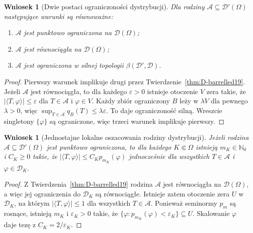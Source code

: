 \documentclass[11pt,a4paper]{article}
\numberwithin{equation}{section}
\theoremstyle{plain}
\newtheorem{wniosek}[twierdzenie]{Wniosek}
\theoremstyle{definition}
\theoremstyle{remark}
\newcommand{\N}{\mathbb N}
\begin{document}
\begin{wniosek}[Dwie postaci ograniczoności dystrybucji]
\label{cor:bounded-distributions19}
Dla rodziny $\mathcal A\subseteq\mathcal D'(\Omega)$
następujące warunki są równoważne:
\begin{enumerate}
\item $\mathcal A$ jest punktowo ograniczona na $\mathcal D(\Omega)$;
\item $\mathcal A$ jest równociągła na $\mathcal D(\Omega)$;
\item $\mathcal A$ jest ograniczona w silnej topologii
$\beta(\mathcal D',\mathcal D)$.
\end{enumerate}
\end{wniosek}
\begin{proof}
Pierwszy warunek implikuje drugi przez
Twierdzenie~\ref{thm:D-barrelled19}. Jeżeli
$\mathcal A$ jest równociągła, to dla każdego
$\varepsilon>0$ istnieje otoczenie $V$ zera takie,
że $|\langle T,\varphi\rangle|\le\varepsilon$ dla
$T\in\mathcal A$ i $\varphi\in V$.
Każdy zbiór ograniczony $B$ leży w $\lambda V$
dla pewnego $\lambda>0$, więc
$\sup_{T\in\mathcal A}q_B(T)\le\lambda\varepsilon$.
To daje ograniczoność silną. Wreszcie singletony
$\{\varphi\}$ są ograniczone, więc trzeci warunek
implikuje pierwszy.
\end{proof}

\begin{wniosek}[Jednostajne lokalne oszacowania rodziny dystrybucji]
\label{cor:uniform-order19}
Jeżeli rodzina $\mathcal A\subseteq\mathcal D'(\Omega)$ jest
punktowo ograniczona, to dla każdego $K\Subset\Omega$
istnieją $m_K\in\N_0$ i $C_K\ge0$ takie, że
$|\langle T,\varphi\rangle|\le C_Kp_{m_K}(\varphi)$
jednocześnie dla wszystkich $T\in\mathcal A$
i $\varphi\in\mathcal D_K$.
\end{wniosek}
\begin{proof}
Z Twierdzenia~\ref{thm:D-barrelled19} rodzina $\mathcal A$
jest równociągła na $\mathcal D(\Omega)$, a więc jej
ograniczenia do $\mathcal D_K$ są równociągłe.
Istnieje zatem otoczenie zera $U$ w $\mathcal D_K$,
na którym $|\langle T,\varphi\rangle|\le1$ dla wszystkich
$T\in\mathcal A$. Ponieważ seminormy $p_m$ są rosnące,
istnieją $m_K$ i $\varepsilon_K>0$ takie, że
$\{\varphi:p_{m_K}(\varphi)<\varepsilon_K\}\subseteq U$.
Skalowanie $\varphi$ daje tezę z $C_K=2/\varepsilon_K$.
\end{proof}
\end{document}

